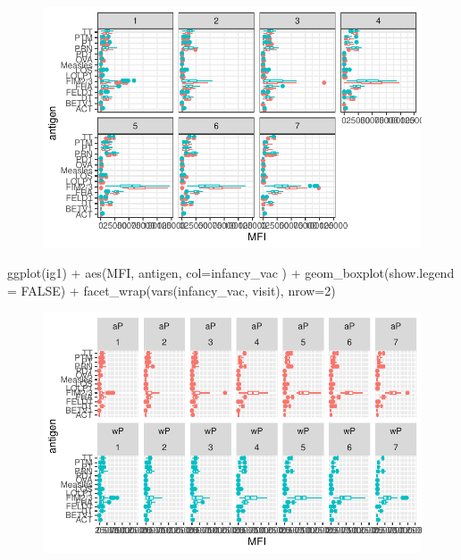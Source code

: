 \documentclass[
  letterpaper,
  DIV=11,
  numbers=noendperiod]{scrartcl}
\newenvironment{Shaded}{\begin{snugshade}}{\end{snugshade}}
\newcommand{\AttributeTok}[1]{\textcolor[rgb]{0.40,0.45,0.13}{#1}}
\newcommand{\ConstantTok}[1]{\textcolor[rgb]{0.56,0.35,0.01}{#1}}
\newcommand{\DecValTok}[1]{\textcolor[rgb]{0.68,0.00,0.00}{#1}}
\newcommand{\FunctionTok}[1]{\textcolor[rgb]{0.28,0.35,0.67}{#1}}
\newcommand{\NormalTok}[1]{\textcolor[rgb]{0.00,0.23,0.31}{#1}}
\newcommand{\SpecialCharTok}[1]{\textcolor[rgb]{0.37,0.37,0.37}{#1}}
\begin{document}
\begin{figure}[H]

{\centering \includegraphics{Class19_files/figure-pdf/unnamed-chunk-24-1.pdf}

}

\end{figure}

\begin{Shaded}
\begin{Highlighting}[]
\FunctionTok{ggplot}\NormalTok{(ig1) }\SpecialCharTok{+}
  \FunctionTok{aes}\NormalTok{(MFI, antigen, }\AttributeTok{col=}\NormalTok{infancy\_vac ) }\SpecialCharTok{+}
  \FunctionTok{geom\_boxplot}\NormalTok{(}\AttributeTok{show.legend =} \ConstantTok{FALSE}\NormalTok{) }\SpecialCharTok{+} 
  \FunctionTok{facet\_wrap}\NormalTok{(}\FunctionTok{vars}\NormalTok{(infancy\_vac, visit), }\AttributeTok{nrow=}\DecValTok{2}\NormalTok{)}
\end{Highlighting}
\end{Shaded}

\begin{figure}[H]

{\centering \includegraphics{Class19_files/figure-pdf/unnamed-chunk-25-1.pdf}

}

\end{figure}
\end{document}
